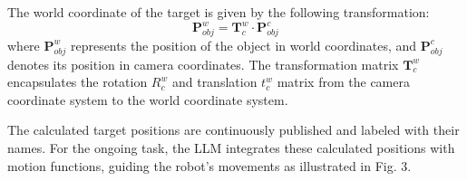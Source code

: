 \documentclass[letterpaper,conference]{ieeeconf}
\begin{document}
The world coordinate of the target is given by the following transformation:
\begin{equation}
\boldsymbol{P}^{\textit{w}}_{\textit{obj}} = \boldsymbol{T}_{\textit{c}}^{\textit{w}} \cdot \boldsymbol{P}^{\textit{c}}_{\textit{obj}}
\end{equation}
where \(\boldsymbol{P}^{\textit{w}}_{\textit{obj}}\) represents the position of the object in world coordinates, and \(\boldsymbol{P}^{\textit{c}}_{\textit{obj}}\) denotes its position in camera coordinates. The transformation matrix \(\boldsymbol{T}_{\textit{c}}^{\textit{w}}\) encapsulates the rotation \(R_{\textit{c}}^{\textit{w}}\) and translation \(t_{\textit{c}}^{\textit{w}}\) matrix from the camera coordinate system to the world coordinate system. 

The calculated target positions are continuously published and labeled with their names. For the ongoing task, the LLM integrates these calculated positions with motion functions, guiding the robot's movements as illustrated in Fig. 3.
\end{document}
